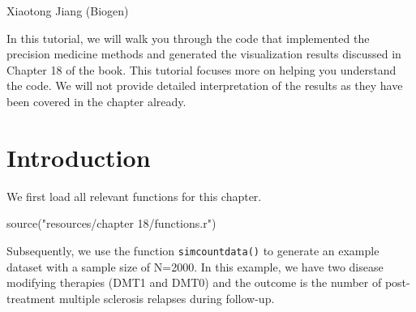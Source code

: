 \documentclass[
  letterpaper,
  DIV=11,
  numbers=noendperiod]{scrreprt}
\newenvironment{Shaded}{\begin{snugshade}}{\end{snugshade}}
\newcommand{\AttributeTok}[1]{\textcolor[rgb]{0.40,0.45,0.13}{#1}}
\newcommand{\CommentTok}[1]{\textcolor[rgb]{0.37,0.37,0.37}{#1}}
\newcommand{\DecValTok}[1]{\textcolor[rgb]{0.68,0.00,0.00}{#1}}
\newcommand{\FloatTok}[1]{\textcolor[rgb]{0.68,0.00,0.00}{#1}}
\newcommand{\FunctionTok}[1]{\textcolor[rgb]{0.28,0.35,0.67}{#1}}
\newcommand{\NormalTok}[1]{\textcolor[rgb]{0.00,0.23,0.31}{#1}}
\newcommand{\OtherTok}[1]{\textcolor[rgb]{0.00,0.23,0.31}{#1}}
\newcommand{\SpecialCharTok}[1]{\textcolor[rgb]{0.37,0.37,0.37}{#1}}
\newcommand{\StringTok}[1]{\textcolor[rgb]{0.13,0.47,0.30}{#1}}
\begin{document}
Xiaotong Jiang (Biogen)

\hfill\break

In this tutorial, we will walk you through the code that implemented the
precision medicine methods and generated the visualization results
discussed in Chapter 18 of the book. This tutorial focuses more on
helping you understand the code. We will not provide detailed
interpretation of the results as they have been covered in the chapter
already.

\hypertarget{introduction-3}{%
\section{Introduction}\label{introduction-3}}

We first load all relevant functions for this chapter.

\begin{Shaded}
\begin{Highlighting}[]
\FunctionTok{source}\NormalTok{(}\StringTok{"resources/chapter 18/functions.r"}\NormalTok{)}
\end{Highlighting}
\end{Shaded}

Subsequently, we use the function \texttt{simcountdata()} to generate an
example dataset with a sample size of N=2000. In this example, we have
two disease modifying therapies (DMT1 and DMT0) and the outcome is the
number of post-treatment multiple sclerosis relapses during follow-up.

\begin{Shaded}
\end{Shaded}
\end{document}
